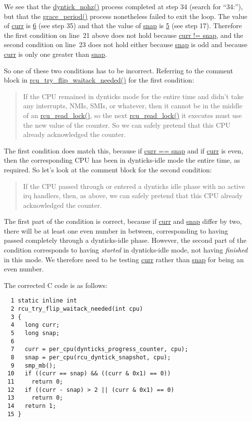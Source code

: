We see that the \url{dyntick_nohz()} process completed
at step 34 (search for ``34:''), but that the
\url{grace_period()} process nonetheless failed to exit the loop.
The value of \url{curr} is \url{6} (see step 35)
and that the value of \url{snap} is \url{5} (see step 17).
Therefore the first condition on line~21 above does not hold because
\url{curr != snap}, and the second condition on line~23
does not hold either because \url{snap} is odd and because
\url{curr} is only one greater than \url{snap}.

So one of these two conditions has to be incorrect.
Referring to the comment block in \url{rcu_try_flip_waitack_needed()}
for the first condition:

\begin{quote}
	If the CPU remained in dynticks mode for the entire time
	and didn't take any interrupts, NMIs, SMIs, or whatever,
	then it cannot be in the middle of an \url{rcu_read_lock()}, so
	the next \url{rcu_read_lock()} it executes must use the new value
	of the counter.  So we can safely pretend that this CPU
	already acknowledged the counter.
\end{quote}

The first condition does match this, because if \url{curr == snap}
and if \url{curr} is even, then the corresponding CPU has been
in dynticks-idle mode the entire time, as required.
So let's look at the comment block for the second condition:

\begin{quote}
	If the CPU passed through or entered a dynticks idle phase with
	no active irq handlers, then, as above, we can safely pretend
	that this CPU already acknowledged the counter.
\end{quote}

The first part of the condition is correct, because if \url{curr}
and \url{snap} differ by two, there will be at least one even
number in between, corresponding to having passed completely through
a dynticks-idle phase.
However, the second part of the condition corresponds to having
\emph{started} in dynticks-idle mode, not having \emph{finished}
in this mode.
We therefore need to be testing \url{curr} rather than
\url{snap} for being an even number.

The corrected C code is as follows:

{ \scriptsize
\begin{verbatim}
  1 static inline int
  2 rcu_try_flip_waitack_needed(int cpu)
  3 {
  4   long curr;
  5   long snap;
  6 
  7   curr = per_cpu(dynticks_progress_counter, cpu);
  8   snap = per_cpu(rcu_dyntick_snapshot, cpu);
  9   smp_mb();
 10   if ((curr == snap) && ((curr & 0x1) == 0))
 11     return 0;
 12   if ((curr - snap) > 2 || (curr & 0x1) == 0)
 13     return 0;
 14   return 1;
 15 }
\end{verbatim}
}

